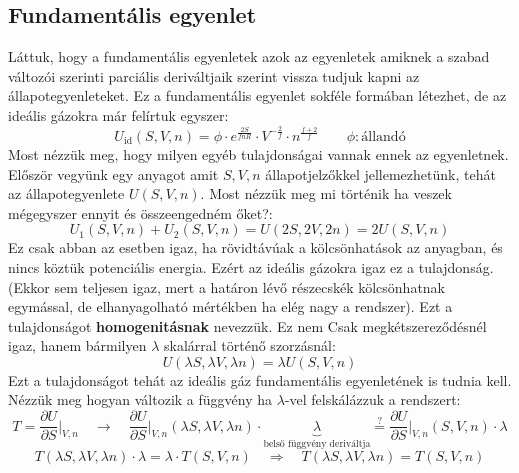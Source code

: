 \documentclass[../main.tex]{subfiles}
\begin{document}
\subsection{Fundamentális egyenlet}
Láttuk, hogy a fundamentális egyenletek azok az egyenletek amiknek a szabad változói szerinti parciális deriváltjaik szerint vissza tudjuk kapni az állapotegyenleteket.
Ez a fundamentális egyenlet sokféle formában létezhet, de az ideális gázokra már felírtuk egyszer:
\begin{equation}
    U_{\text{id}}(S, V, n) = \phi \cdot e^{\frac{2S}{fnR}} \cdot V^{-\frac{2}{f}} \cdot n^{\frac{f + 2}{f}} \qquad \phi: \text{állandó}
\end{equation}
Most nézzük meg, hogy milyen egyéb tulajdonságai vannak ennek az egyenletnek. Először vegyünk egy anyagot amit $S, V, n$ állapotjelzőkkel jellemezhetünk,
tehát az állapotegyenlete $U(S, V, n)$. Most nézzük meg mi történik ha veszek mégegyszer ennyit és összeengedném őket?:
\begin{equation}
    U_1(S, V, n) + U_2(S, V, n) = U(2S, 2V, 2n) = 2 U(S, V, n)
\end{equation}
Ez csak abban az esetben igaz, ha rövidtávúak a kölcsönhatások az anyagban, és nincs köztük potenciális energia. Ezért az ideális gázokra igaz ez a tulajdonság. (Ekkor sem teljesen igaz,
mert a határon lévő részecskék kölcsönhatnak egymással, de elhanyagolható mértékben ha elég nagy a rendszer). Ezt a tulajdonságot \textbf{homogenitásnak} nevezzük. Ez nem Csak
megkétszereződésnél igaz, hanem bármilyen $\lambda$ skalárral történő szorzásnál:
\begin{equation}
    U(\lambda S, \lambda V, \lambda n) = \lambda U(S, V, n)
\end{equation}
Ezt a tulajdonságot tehát az ideális gáz fundamentális egyenletének is tudnia kell. Nézzük meg hogyan változik a függvény ha $\lambda$-vel felskálázzuk a rendszert:
\begin{equation}
    T = \frac{\partial U}{\partial S}\bigg|_{V,n} \quad \to \quad \frac{\partial U}{\partial S}\bigg|_{V,n} (\lambda S, \lambda V, \lambda n) \cdot \underbrace{\lambda}_{\text{belső függvény deriváltja}} \stackrel{?}{=} \frac{\partial U}{\partial S}\bigg|_{V,n} (S, V, n) \cdot \lambda
\end{equation}
\begin{equation}
    T(\lambda S, \lambda V, \lambda n) \cdot \lambda= \lambda \cdot T (S, V, n) \quad \Rightarrow \quad T(\lambda S, \lambda V, \lambda n) = T (S, V, n)
\end{equation}
\end{document}
